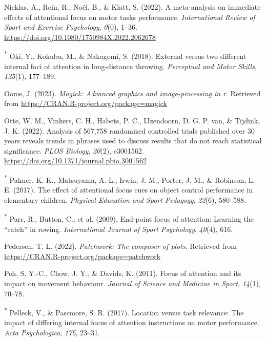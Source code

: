 \documentclass[
  man, donotrepeattitle,floatsintext]{apa7}
\newlength{\cslhangindent}
\newlength{\cslentryspacingunit} %
\newenvironment{CSLReferences}[2] %
 {%
  \setlength{\parindent}{0pt}
  \ifodd #1
  \let\oldpar\par
  \def\par{\hangindent=\cslhangindent\oldpar}
  \fi
  \setlength{\parskip}{#2\cslentryspacingunit}
 }%
 {}
\begin{document}
\begin{CSLReferences}{1}{0}
\leavevmode{}%
Nicklas, A., Rein, R., Noël, B., \& Klatt, S. (2022). A meta-analysis on immediate effects of attentional focus on motor tasks performance. \emph{International Review of Sport and Exercise Psychology}, \emph{0}(0), 1--36. \url{https://doi.org/10.1080/1750984X.2022.2062678}

\leavevmode{}%
\textsuperscript{*} Oki, Y., Kokubu, M., \& Nakagomi, S. (2018). External versus two different internal foci of attention in long-distance throwing. \emph{Perceptual and Motor Skills}, \emph{125}(1), 177--189.

\leavevmode{}%
Ooms, J. (2023). \emph{Magick: Advanced graphics and image-processing in r}. Retrieved from \url{https://CRAN.R-project.org/package=magick}

\leavevmode{}%
Otte, W. M., Vinkers, C. H., Habets, P. C., IJzendoorn, D. G. P. van, \& Tijdink, J. K. (2022). Analysis of 567,758 randomized controlled trials published over 30 years reveals trends in phrases used to discuss results that do not reach statistical significance. \emph{PLOS Biology}, \emph{20}(2), e3001562. \url{https://doi.org/10.1371/journal.pbio.3001562}

\leavevmode{}%
\textsuperscript{*} Palmer, K. K., Matsuyama, A. L., Irwin, J. M., Porter, J. M., \& Robinson, L. E. (2017). The effect of attentional focus cues on object control performance in elementary children. \emph{Physical Education and Sport Pedagogy}, \emph{22}(6), 580--588.

\leavevmode{}%
\textsuperscript{*} Parr, R., Button, C., et al. (2009). End-point focus of attention: Learning the {``catch''} in rowing. \emph{International Journal of Sport Psychology}, \emph{40}(4), 616.

\leavevmode{}%
Pedersen, T. L. (2022). \emph{Patchwork: The composer of plots}. Retrieved from \url{https://CRAN.R-project.org/package=patchwork}

\leavevmode{}%
Peh, S. Y.-C., Chow, J. Y., \& Davids, K. (2011). Focus of attention and its impact on movement behaviour. \emph{Journal of Science and Medicine in Sport}, \emph{14}(1), 70--78.

\leavevmode{}%
\textsuperscript{*} Pelleck, V., \& Passmore, S. R. (2017). Location versus task relevance: The impact of differing internal focus of attention instructions on motor performance. \emph{Acta Psychologica}, \emph{176}, 23--31.


\end{CSLReferences}
\end{document}
